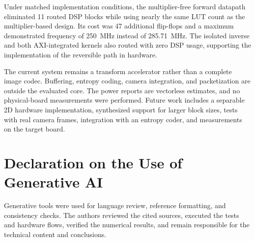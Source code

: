 \documentclass[conference]{IEEEtran}
\begin{document}
Under matched implementation conditions, the multiplier-free forward datapath
eliminated 11 routed DSP blocks while using nearly the same LUT count as the
multiplier-based design. Its cost was 47 additional flip-flops and a maximum
demonstrated frequency of 250~MHz instead of 285.71~MHz. The isolated inverse
and both AXI-integrated kernels also routed with zero DSP usage, supporting the
implementation of the reversible path in hardware.

The current system remains a transform accelerator rather than a complete image
codec. Buffering, entropy coding, camera integration, and packetization are
outside the evaluated core. The power reports are vectorless estimates, and no
physical-board measurements were performed. Future work includes a separable
2D hardware implementation, synthesized support for larger block sizes, tests
with real camera frames, integration with an entropy coder, and measurements on
the target board.

\section*{Declaration on the Use of Generative AI}
Generative tools were used for language review, reference formatting, and
consistency checks. The authors reviewed the cited sources, executed the tests
and hardware flows, verified the numerical results, and remain responsible for
the technical content and conclusions.
\end{document}
